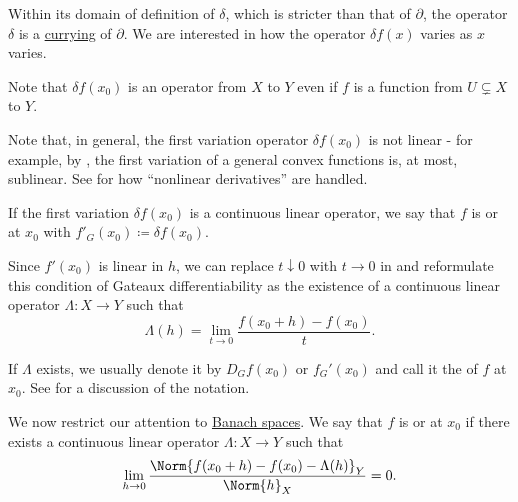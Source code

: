 \begin{definition}
\begin{DefEnum}
    Within its domain of definition of \( \delta \), which is stricter than that of \( \partial \), the operator \( \delta \) is a \hyperref[def:function/argument]{currying} of \( \partial \). We are interested in how the operator \( \delta f(x) \) varies as \( x \) varies.

    Note that \( \delta f(x_0) \) is an operator from \( X \) to \( Y \) even if \( f \) is a function from \( U \subsetneq X \) to \( Y \).

    Note that, in general, the first variation operator \( \delta f(x_0) \) is not linear - for example, by , the first variation of a general convex functions is, at most, sublinear. See  for how \enquote{nonlinear derivatives} are handled.

    If the first variation \( \delta f(x_0) \) is a continuous linear operator, we say that \( f \) is  or  at \( x_0 \) with  \( f'_G(x_0) \coloneqq \delta f(x_0) \).

    Since \( f'(x_0) \) is linear in \( h \), we can replace \( t \downarrow 0 \) with \( t \to 0 \) in  and reformulate this condition of Gateaux differentiability as the existence of a continuous linear operator \( \Lambda: X \to Y \) such that
    \begin{equation}\label{def:differentiability/gateaux/condition}
      \Lambda(h) = \lim_{t \to 0} \frac {f(x_0 + h) - f(x_0)} t.
    \end{equation}

    If \( \Lambda \) exists, we usually denote it by \( D_G f(x_0) \) or \( f_G'(x_0) \) and call it the  of \( f \) at \( x_0 \). See  for a discussion of the notation.

    We now restrict our attention to \hyperref[def:banach_space]{Banach spaces}. We say that \( f \) is  or  at \( x_0 \) if there exists a continuous linear operator \( \Lambda: X \to Y \) such that
    \begin{equation}\label{def:differentiability/frechet/condition}
      \lim_{h \to 0} \frac {\Norm{f(x_0 + h) - f(x_0) - \Lambda(h)}_Y} {\Norm{h}_X} = 0.
    \end{equation}


\end{DefEnum}
\end{definition}

